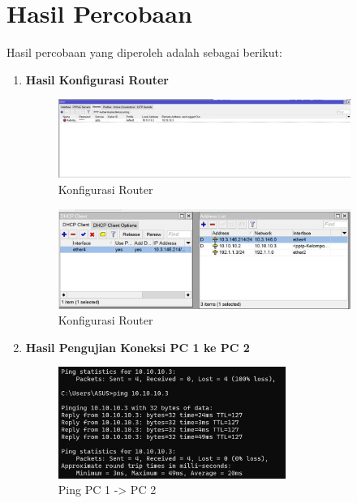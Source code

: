 \section*{Hasil Percobaan} %

Hasil percobaan yang diperoleh adalah sebagai berikut:

\begin{enumerate}

    \item \textbf{Hasil Konfigurasi Router}
    
    \begin{figure}[H]
        \centering
        \includegraphics[width=0.9\textwidth]{img/konfigurasi_1.jpeg}
        \caption{Konfigurasi Router}
        \label{fig:konfigurasi_awal}
    \end{figure}

    \begin{figure}[H]
        \centering
        \includegraphics[width=0.9\textwidth]{img/konfigurasi_2.jpeg}
        \caption{Konfigurasi Router}
        \label{fig:konfigurasi_akhir}
    \end{figure}

    \item \textbf{Hasil Pengujian Koneksi PC 1 ke PC 2}
    
    \begin{figure}[H]
        \centering
        \includegraphics[width=0.7\textwidth]{img/hasil_pc1.jpeg}
        \caption{Ping PC 1 -> PC 2}
        \label{fig:pengujian_koneksi_pc1}
    \end{figure}


\end{enumerate}
